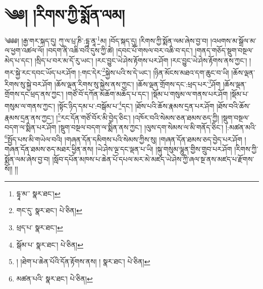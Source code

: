 \setcounter{footnote}{0} 
\chapter{༄༅། །རིགས་ཀྱི་སྨོན་ལམ།}༄༅༅། །རྒྱ་གར་སྐད་དུ། ཀུ་ལ་པྲ་ཎི་:དྷཱ་ནཱ་\footnote{དྷཱ་མ་་  སྣར་ཐང་། }མ། །བོད་སྐད་དུ། །རིགས་ཀྱི་སྨོན་ལམ་ཞེས་བྱ་བ། །འཕགས་མ་སྒྲོལ་མ་ལ་ཕྱག་འཚལ་ལོ། །བདག་ནི་འཆི་བའི་དུས་ཀྱི་ཚེ། །དབང་པོ་གསལ་བར་འཆི་བ་དང་། །གནད་གཅོད་སྡུག་བསྔལ་མེད་པ་དང་། །སྲིད་པ་བར་མ་དོ་རུ་ཡང་། །རང་བྱུང་ཡེ་ཤེས་རྟོགས་པར་ཤོག །རང་བྱུང་ཡེ་ཤེས་རྟོགས་ནས་ཀྱང་། །གར་སྐྱེ་རང་དབང་ཡོད་པར་ཤོག །:གང་དེར་\footnote{གང་དུ་  སྣར་ཐང་།  པེ་ཅིན། }སྐྱེས་པའི་ས་དེ་ཡང་། །ཉིན་མོངས་མཐའ་དག་ཆུང་བ་ཡི། །ཆོས་ལྡན་རིགས་སུ་སྐྱེ་བར་ཤོག །ཆོས་ལྡན་རིགས་སུ་སྐྱེས་ནས་ཀྱང་། །ཆོས་ལྡན་གྲོགས་དང་:ཕྲད་པར་\footnote{ཕྲད་པ་  སྣར་ཐང་། }ཤོག །ཆོས་ལྡན་གྲོགས་དང་ཕྲད་ནས་ཀྱང་། །གཙོ་བོ་དཀོན་མཆོག་མཆོད་པ་དང་། །སྡོམ་པ་གསུམ་ལ་གནས་པར་ཤོག །སྡོམ་པ་གསུམ་ལ་གནས་ཀྱང་། །སྟོང་ཉིད་དམ་པ་:བསྒོམ་པ་\footnote{སྒོམ་པ་  སྣར་ཐང་།  པེ་ཅིན། }དང་། །ཐོས་པའི་ཆོས་རྣམས་དྲན་པར་ཤོག །ཐོས་བའི་ཆོས་རྣམས་དྲན་ནས་ཀྱང་། །\footnote{། །ཐེག་པ་ཆེན་པོའི་དོན་རྟོགས་ནས། །  སྣར་ཐང་།  པེ་ཅིན། }རང་དོན་གཙོ་བོར་མི་བྱེད་ཅིང་། །འཁོར་བའི་སེམས་ཅན་ཐམས་ཅད་ཀྱི། །སྡུག་བསྔལ་བདག་ལ་སྨིན་པར་ཤོག །སྡུག་བསྔལ་བདག་ལ་སྨིན་ནས་ཀྱང་། །ལུས་དག་སེམས་ལ་མི་གནོད་ཅིང་། །:མཚན་མའི་\footnote{མཚན་པའི་  སྣར་ཐང་།  པེ་ཅིན། }སྤྱོད་པས་མི་གཡེལ་བའི། །གཞན་དོན་དམིགས་པའི་སེམས་ཀྱིས་སུ། །གཞན་དོན་ཐམས་ཅད་བྱེད་པར་ཤོག །གཞན་དོན་ཐམས་ཅད་མཐར་ཕྱིན་ནས། །ཡེ་ཤེས་ལྔ་དང་ལྡན་པ་ཡི། །སྐུ་གསུམ་ལྷུན་གྱིས་གྲུབ་པར་ཤོག །རིགས་ཀྱི་སྨོན་ལམ་ཞེས་བྱ་བ། །སློབ་དཔོན་མཁས་པ་ཆེན་པོ་དཔལ་མར་མེ་མཛད་ཡེ་ཤེས་ཀྱི་ཞལ་སྔ་ནས་མཛད་པ་རྫོགས་སོ།། །།